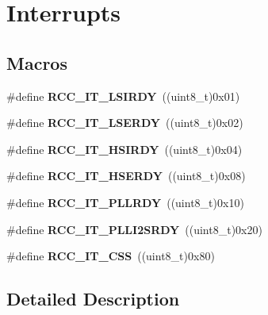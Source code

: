 \hypertarget{group___r_c_c___interrupt}{}\section{Interrupts}
\label{group___r_c_c___interrupt}
\subsection*{Macros}
\begin{DoxyCompactItemize}
\item 
\#define {\bfseries R\+C\+C\+\_\+\+I\+T\+\_\+\+L\+S\+I\+R\+DY}~((uint8\+\_\+t)0x01)\hypertarget{group___r_c_c___interrupt_ga2b4ef277c1b71f96e0bef4b9a72fca94}{}\label{group___r_c_c___interrupt_ga2b4ef277c1b71f96e0bef4b9a72fca94}

\item 
\#define {\bfseries R\+C\+C\+\_\+\+I\+T\+\_\+\+L\+S\+E\+R\+DY}~((uint8\+\_\+t)0x02)\hypertarget{group___r_c_c___interrupt_gad6b6e78a426850f595ef180d292a673d}{}\label{group___r_c_c___interrupt_gad6b6e78a426850f595ef180d292a673d}

\item 
\#define {\bfseries R\+C\+C\+\_\+\+I\+T\+\_\+\+H\+S\+I\+R\+DY}~((uint8\+\_\+t)0x04)\hypertarget{group___r_c_c___interrupt_ga69637e51b71f73f519c8c0a0613d042f}{}\label{group___r_c_c___interrupt_ga69637e51b71f73f519c8c0a0613d042f}

\item 
\#define {\bfseries R\+C\+C\+\_\+\+I\+T\+\_\+\+H\+S\+E\+R\+DY}~((uint8\+\_\+t)0x08)\hypertarget{group___r_c_c___interrupt_gad13eaede352bca59611e6cae68665866}{}\label{group___r_c_c___interrupt_gad13eaede352bca59611e6cae68665866}

\item 
\#define {\bfseries R\+C\+C\+\_\+\+I\+T\+\_\+\+P\+L\+L\+R\+DY}~((uint8\+\_\+t)0x10)\hypertarget{group___r_c_c___interrupt_ga68d48e7811fb58f2649dce6cf0d823d9}{}\label{group___r_c_c___interrupt_ga68d48e7811fb58f2649dce6cf0d823d9}

\item 
\#define {\bfseries R\+C\+C\+\_\+\+I\+T\+\_\+\+P\+L\+L\+I2\+S\+R\+DY}~((uint8\+\_\+t)0x20)\hypertarget{group___r_c_c___interrupt_ga6468ff3bad854272cf1120ffbf69b7ac}{}\label{group___r_c_c___interrupt_ga6468ff3bad854272cf1120ffbf69b7ac}

\item 
\#define {\bfseries R\+C\+C\+\_\+\+I\+T\+\_\+\+C\+SS}~((uint8\+\_\+t)0x80)\hypertarget{group___r_c_c___interrupt_ga9bb34a4912d2084dc1c0834eb53aa7a3}{}\label{group___r_c_c___interrupt_ga9bb34a4912d2084dc1c0834eb53aa7a3}

\end{DoxyCompactItemize}


\subsection{Detailed Description}
